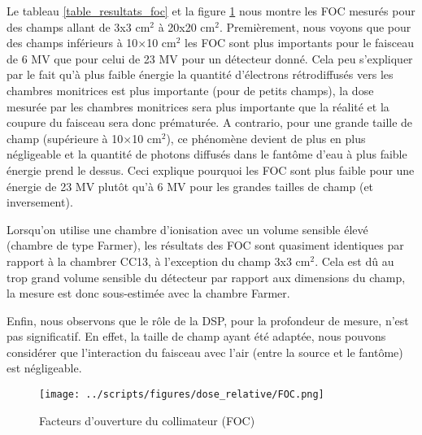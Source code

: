 \documentclass{book}
\begin{document}
Le tableau \ref*{table_resultats_foc} et la figure \ref*{fig_foc} nous montre les FOC mesurés pour des champs allant de 3x3 cm$^2$ à 20x20 cm$^2$. Premièrement, nous voyons que pour des champs inférieurs à 10$\times$10 cm$^2$ les FOC sont plus importants pour le faisceau de 6 MV que pour celui de 23 MV pour un détecteur donné. Cela peu s'expliquer par le fait qu'à plus faible énergie la quantité d'électrons rétrodiffusés vers les chambres monitrices est plus importante (pour de petits champs), la dose mesurée par les chambres monitrices sera plus importante que la réalité et la coupure du faisceau sera donc prématurée. A contrario, pour une grande taille de champ (supérieure à 10$\times$10 cm$^2$), ce phénomène devient de plus en plus négligeable et la quantité de photons diffusés dans le fantôme d'eau à plus faible énergie prend le dessus. Ceci explique pourquoi les FOC sont plus faible pour une énergie de 23 MV plutôt qu'à 6 MV pour les grandes tailles de champ (et inversement).

Lorsqu'on utilise une chambre d'ionisation avec un volume sensible élevé (chambre de type Farmer), les résultats des FOC sont quasiment identiques par rapport à la chambrer CC13, à l'exception du champ 3x3 cm$^2$. Cela est dû au trop grand volume sensible du détecteur par rapport aux dimensions du champ, la mesure est donc sous-estimée avec la chambre Farmer.

Enfin,  nous observons que le rôle de la DSP, pour la profondeur de mesure, n'est pas significatif. En effet, la taille de champ ayant été adaptée, nous pouvons considérer que l'interaction du faisceau avec l'air (entre la source et le fantôme) est négligeable.

\begin{figure}[h]
  \centering
  \texttt{[image: ../scripts/figures/dose\_relative/FOC.png]}
  \caption{Facteurs d'ouverture du collimateur (FOC)}
  \label{fig_foc}
\end{figure}
\end{document}
